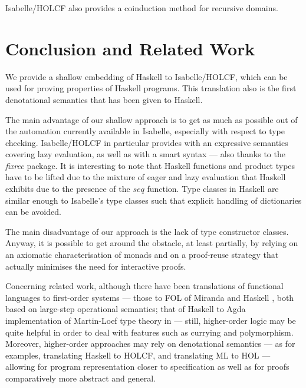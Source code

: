 \documentclass{llncs}
\begin{document}
Isabelle/HOLCF also provides a coinduction method for recursive
domains.

\section{Conclusion and Related Work}
\label{sec:conclusion}

We provide a shallow embedding of Haskell to Isabelle/HOLCF, which can
be used for proving properties of Haskell programs.  This translation
also is the first denotational semantics that has been given to
Haskell.

The main advantage of our shallow approach is to get as much as
possible out of the automation currently available in Isabelle,
especially with respect to type checking. Isabelle/HOLCF in particular
provides with an expressive semantics covering lazy evaluation, as
well as with a smart syntax --- also thanks to the \emph{fixrec}
package. It is interesting to note that Haskell functions and product
types have to be lifted due to the mixture of eager and lazy evaluation
that Haskell exhibits due to the presence of the $seq$ function.
Type classes in Haskell are similar enough to Isabelle's type classes
such that explicit handling of dictionaries can be avoided.

The main disadvantage of our approach is the lack of type
constructor classes. Anyway, it is possible to get around the
obstacle, at least partially, by relying on an axiomatic
characterisation of monads and on a proof-reuse strategy that actually
minimises the need for interactive proofs.

Concerning related work, although there have been translations of
functional languages to first-order systems --- those to FOL of
Miranda \cite{Thompson95,Thompson89,Thompson95b} and Haskell
\cite{Thompson92}, both based on large-step operational semantics;
that of Haskell to Agda implementation of Martin-Loef type theory in
\cite{Abel} --- still, higher-order logic may be quite helpful in
order to deal with features such as currying and polymorphism.
Moreover, higher-order approaches may rely on denotational semantics
--- as for examples, \cite{Huff} translating Haskell to HOLCF, and
\cite{Pollack} translating ML to HOL --- allowing for program
representation closer to specification as well as for proofs
comparatively more abstract and general.
\end{document}

